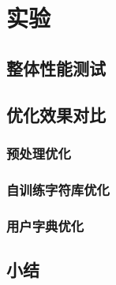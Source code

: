 \chapter{实验}
\label{chap:experiments}

\section{整体性能测试}

\section{优化效果对比}
\subsection{预处理优化}

\subsection{自训练字符库优化}

\subsection{用户字典优化}

\section{小结}
